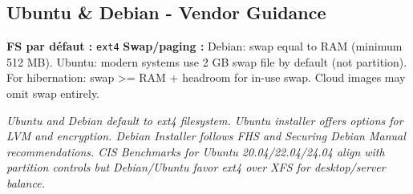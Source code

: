\documentclass[10pt,a4paper]{article}
\begin{document}
\subsection{Ubuntu \& Debian - Vendor Guidance}
\noindent\small \textbf{FS par d\'efaut :} \texttt{ext4} \quad\textbullet\quad \textbf{Swap/paging :} Debian: swap equal to RAM (minimum 512 MB). Ubuntu: modern systems use 2 GB swap file by default (not partition). For hibernation: swap >= RAM + headroom for in-use swap. Cloud images may omit swap entirely.\normalsize\par\smallskip
\noindent\small\textit{Ubuntu and Debian default to ext4 filesystem. Ubuntu installer offers options for LVM and encryption. Debian Installer follows FHS and Securing Debian Manual recommendations. CIS Benchmarks for Ubuntu 20.04/22.04/24.04 align with partition controls but Debian/Ubuntu favor ext4 over XFS for desktop/server balance.}\normalsize\par\smallskip
\end{document}
